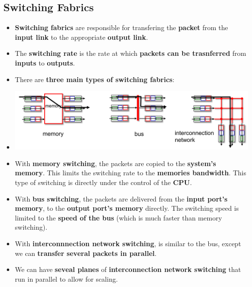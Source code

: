 \documentclass{article}
\begin{document}
    \subsection*{Switching Fabrics}
    \begin{itemize}
        \item \textbf{Switching fabrics} are responsible for transfering the \textbf{packet} from the \textbf{input link} to the appropriate \textbf{output link}.
        \item The \textbf{switching rate} is the rate at which \textbf{packets can be trasnferred} from \textbf{inputs} to \textbf{outputs}.
        \item There are \textbf{three main types of switching fabrics}:
        \item[] \includegraphics[width=\textwidth - 25pt]{images/Switching-Fabrics.png}
        \item With \textbf{memory switching}, the packets are copied to the \textbf{system's memory}. This limits the switching rate to the \textbf{memories bandwidth}. This type of switching is directly under the control of the \textbf{CPU}.
        \item With \textbf{bus switching}, the packets are delivered from the \textbf{input port's memory}, to the \textbf{output port's memory} directly. The switching speed is limited to the \textbf{speed of the bus} (which is much faster than memory switching). 
        \item With \textbf{interconnnection network switching}, is similar to the bus, except we can \textbf{transfer several packets in parallel}.
        \item We can have \textbf{seveal planes} of \textbf{interconnection network switching} that run in parallel to allow for scaling.
    \end{itemize}
\end{document}

